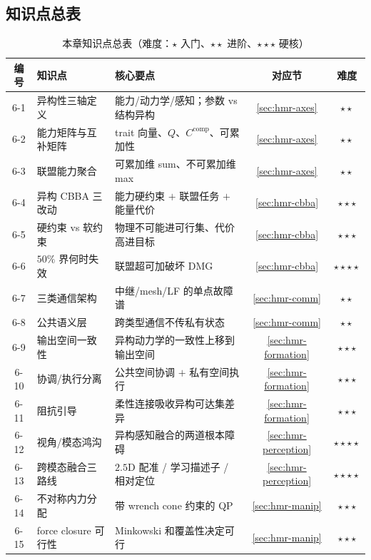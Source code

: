 \subsection*{知识点总表}
\begin{table}[H]\centering\footnotesize
\caption{本章知识点总表（难度：$\star$ 入门、$\star\star$ 进阶、$\star\star\star$ 硬核）}
\label{tab:hmr-knowledge}
\begin{tabular}{clp{5.4cm}cc}
\toprule
编号 & 知识点 & 核心要点 & 对应节 & 难度 \\
\midrule
6-1 & 异构性三轴定义 & 能力/动力学/感知；参数 vs 结构异构 & \cref{sec:hmr-axes} & $\star\star$ \\
6-2 & 能力矩阵与互补矩阵 & trait 向量、$Q$、$C^{\mathrm{comp}}$、可累加性 & \cref{sec:hmr-axes} & $\star\star$ \\
6-3 & 联盟能力聚合 & 可累加维 sum、不可累加维 max & \cref{sec:hmr-axes} & $\star\star$ \\
6-4 & 异构 CBBA 三改动 & 能力硬约束 $+$ 联盟任务 $+$ 能量代价 & \cref{sec:hmr-cbba} & $\star\star\star$ \\
6-5 & 硬约束 vs 软约束 & 物理不可能进可行集、代价高进目标 & \cref{sec:hmr-cbba} & $\star\star\star$ \\
6-6 & $50\%$ 界何时失效 & 联盟超可加破坏 DMG & \cref{sec:hmr-cbba} & $\star\star\star\star$ \\
6-7 & 三类通信架构 & 中继/mesh/LF 的单点故障谱 & \cref{sec:hmr-comm} & $\star\star$ \\
6-8 & 公共语义层 & 跨类型通信不传私有状态 & \cref{sec:hmr-comm} & $\star\star$ \\
6-9 & 输出空间一致性 & 异构动力学的一致性上移到输出空间 & \cref{sec:hmr-formation} & $\star\star\star$ \\
6-10 & 协调/执行分离 & 公共空间协调 $+$ 私有空间执行 & \cref{sec:hmr-formation} & $\star\star\star$ \\
6-11 & 阻抗引导 & 柔性连接吸收异构可达集差异 & \cref{sec:hmr-formation} & $\star\star\star$ \\
6-12 & 视角/模态鸿沟 & 异构感知融合的两道根本障碍 & \cref{sec:hmr-perception} & $\star\star\star\star$ \\
6-13 & 跨模态融合三路线 & $2.5\mathrm{D}$ 配准 / 学习描述子 / 相对定位 & \cref{sec:hmr-perception} & $\star\star\star\star$ \\
6-14 & 不对称内力分配 & 带 wrench cone 约束的 QP & \cref{sec:hmr-manip} & $\star\star\star$ \\
6-15 & force closure 可行性 & Minkowski 和覆盖性决定可行 & \cref{sec:hmr-manip} & $\star\star\star$ \\

\end{tabular}
\end{table}
